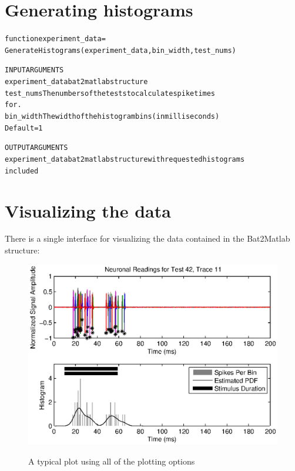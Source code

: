\documentclass[11pt,letterpaper]{article}
\begin{document}
\section{Generating histograms}
\begin{footnotesize}
\begin{alltt}
function experiment_data =
   GenerateHistograms(experiment_data,bin_width,test_nums)

   INPUT ARGUMENTS
   experiment_data     bat2matlab structure
   test_nums           The numbers of the tests to calculate spike times
                       for.
   bin_width           The width of the histogram bins (in milliseconds)
                       Default = 1

   OUTPUT ARGUMENTS
   experiment_data     bat2matlab structure with requested histograms
                       included
\end{alltt}
\end{footnotesize}
\clearpage
\section{Visualizing the data}
There is a single interface for visualizing the data contained in
the Bat2Matlab structure:

\begin{figure}
\begin{center}
  \includegraphics{BasicPlot}\\
  \caption{A typical plot using all of the plotting options}\label{BasicPlot}
\end{center}
\end{figure}
\end{document}

